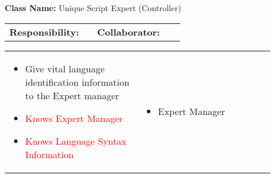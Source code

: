 \begin{cards}[]
    \textbf{Class Name:} Unique Script Expert (Controller)
    \tcbline
    \begin{tabular}{p{0.45\linewidth} | p{0.45\linewidth}}
        \textbf{Responsibility:}& 
        \textbf{Collaborator:}\\
    \end{tabular}
    \tcbline
    \begin{tabular}{p{0.45\linewidth} | p{0.45\linewidth}}
        \begin{itemize}
            \item Give vital language identification information to the Expert manager
            \item \textcolor{red}{Knows Expert Manager}
            \item \textcolor{red}{Knows Language Syntax Information}
        \end{itemize}
        &
        \begin{itemize}
            \item Expert Manager
        \end{itemize}
    \end{tabular}
\end{cards}